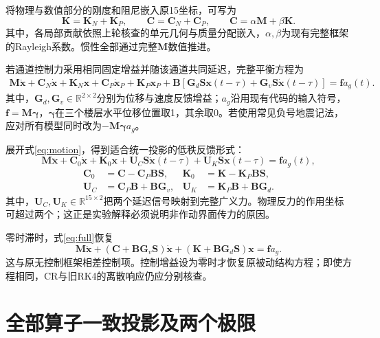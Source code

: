 \documentclass[UTF8,11pt,a4paper]{ctexart}
\newcommand{\mat}[1]{\bm{#1}}
\begin{document}
将物理与数值部分的刚度和阻尼嵌入原15坐标，可写为
\begin{equation}
 \mat K=\mat K_N+\mat K_P,\qquad
 \mat C=\mat C_N+\mat C_P,\qquad \mat C=\alpha\mat M+\beta\mat K.
\end{equation}
其中，各局部贡献依照上轮核查的单元几何与质量分配嵌入，$\alpha,\beta$为现有完整框架的Rayleigh系数。惯性全部通过完整$\mat M$数值推进。

若通道控制力采用相同固定增益并随该通道共同延迟，完整平衡方程为
\begin{align}
 \mat M\ddot{\mat x}+\mat C_N\dot{\mat x}+\mat K_N\mat x
 +\mat C_P\dot{\mat x}_P+\mat K_P\mat x_P
 +\mat B[\mat G_d\mat S\mat x(t-\tau)+\mat G_v\mat S\dot{\mat x}(t-\tau)]
 =\mat f a_g(t).\label{eq:balance}
\end{align}
其中，$\mat G_d,\mat G_v\in\mathbb R^{2\times2}$分别为位移与速度反馈增益；$a_g$沿用现有代码的输入符号，$\mat f=\mat M\mat\gamma$，$\mat\gamma$在三个楼层水平位移位置取1，其余取0。若使用常见负号地震记法，应对所有模型同时改为$-\mat M\mat\gamma a_g$。

展开式\eqref{eq:motion}，得到适合统一投影的低秩反馈形式：
\begin{equation}\label{eq:full}
 \mat M\ddot{\mat x}+\mat C_0\dot{\mat x}+\mat K_0\mat x
 +\mat U_C\mat S\dot{\mat x}(t-\tau)+\mat U_K\mat S\mat x(t-\tau)
 =\mat f a_g(t),
\end{equation}
\begin{align}
 \mat C_0&=\mat C-\mat C_P\mat B\mat S,&
 \mat K_0&=\mat K-\mat K_P\mat B\mat S,\label{eq:current}\\
 \mat U_C&=\mat C_P\mat B+\mat B\mat G_v,&
 \mat U_K&=\mat K_P\mat B+\mat B\mat G_d.\label{eq:ports}
\end{align}
其中，$\mat U_C,\mat U_K\in\mathbb R^{15\times2}$把两个延迟信号映射到完整广义力。物理反力的作用坐标可超过两个；这正是实验解释必须说明非作动界面传力的原因。

零时滞时，式\eqref{eq:full}恢复
\begin{equation}\label{eq:zero}
 \mat M\ddot{\mat x}+(\mat C+\mat B\mat G_v\mat S)\dot{\mat x}
 +(\mat K+\mat B\mat G_d\mat S)\mat x=\mat f a_g.
\end{equation}
这与原无控制框架相差控制项。控制增益设为零时才恢复原被动结构方程；即使方程相同，CR与旧RK4的离散响应仍应分别核查。

\section{全部算子一致投影及两个极限}
\end{document}
